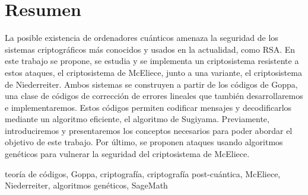 \chapter*{Resumen}

La posible existencia de ordenadores cuánticos amenaza la seguridad de los sistemas criptográficos más conocidos y usados en la actualidad, como RSA. En este trabajo se propone, se estudia y se implementa un criptosistema resistente a estos ataques, el criptosistema de McEliece, junto a una variante, el criptosistema de Niederreiter. Ambos sistemas se construyen a partir de los códigos de Goppa, una clase de códigos de corrección de errores lineales que también desarrollaremos e implementaremos. Estos códigos permiten codificar mensajes y decodificarlos mediante un algoritmo eficiente, el algoritmo de Sugiyama. Previamente, introduciremos y presentaremos los conceptos necesarios para poder abordar el objetivo de este trabajo. Por último, se proponen ataques usando algoritmos genéticos para vulnerar la seguridad del criptosistema de McEliece.

\small{ teoría de códigos, \; Goppa, \; criptografía, \; criptografía post-cuántica, \; McEliece, \; Niederreiter, \; algoritmos genéticos, \; SageMath}

\newpage
